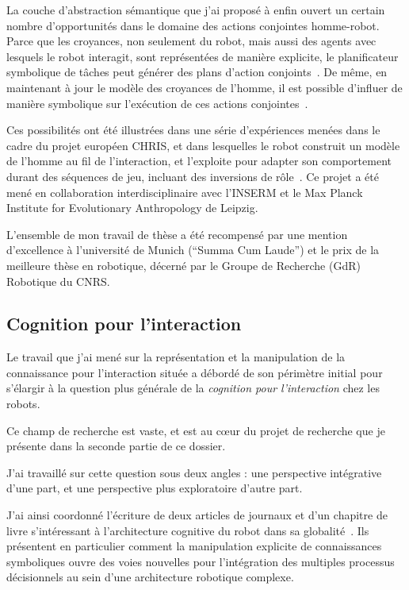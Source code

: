 \documentclass[a4paper]{article}
\begin{document}
La couche d'abstraction sémantique que j'ai proposé à enfin ouvert un certain
nombre d'opportunités dans le domaine des actions conjointes homme-robot. Parce
que les croyances, non seulement du robot, mais aussi des agents avec lesquels
le robot interagit, sont représentées de manière explicite, le planificateur
symbolique de tâches peut générer des plans d'action
conjoints~\cite{alami2011when, lemaignan2012bridges, clodic2013robot}. De même, en
maintenant à jour le modèle des croyances de l'homme, il est possible d'influer
de manière symbolique sur l'exécution de ces actions
conjointes~\cite{gharbi2013natural}.

Ces possibilités ont été illustrées dans une série d'expériences menées dans le
cadre du projet européen CHRIS, et dans lesquelles le robot construit un modèle
de l'homme au fil de l'interaction, et l'exploite pour adapter son comportement
durant des séquences de jeu, incluant des inversions de
rôle~\cite{lallee2010towards, lallee2011towards, lallee2012towards}. Ce projet a
été mené en collaboration interdisciplinaire avec l'INSERM et le Max Planck
Institute for Evolutionary Anthropology de Leipzig.

L'ensemble de mon travail de thèse a été recompensé par une mention d'excellence
à l'université de Munich (``Summa Cum Laude'') et le prix de la meilleure
thèse en robotique, décerné par le Groupe de Recherche (GdR) Robotique du CNRS.

\subsection*{Cognition pour l'interaction%
  \label{cognition-for-interaction}%
}

Le travail que j'ai mené sur la représentation et la manipulation de la
connaissance pour l'interaction située a débordé de son périmètre
initial pour s'élargir à la question plus générale de la \emph{cognition pour
l'interaction} chez les robots.

Ce champ de recherche est vaste, et est au c\oe ur du projet de recherche que je
présente dans la seconde partie de ce dossier.

J'ai travaillé sur cette question sous deux angles : une perspective
intégrative d'une part, et une perspective plus exploratoire d'autre part.

J'ai ainsi coordonné l'écriture de deux articles de journaux et d'un chapitre de
livre s'intéressant à l'architecture cognitive du robot dans sa
globalité~\cite{alami2011when, lemaignan2012bridges, lemaignan2015human}. Ils
présentent en particulier comment la manipulation explicite de connaissances
symboliques ouvre des voies nouvelles pour l'intégration des multiples processus
décisionnels au sein d'une architecture robotique complexe.
\end{document}
